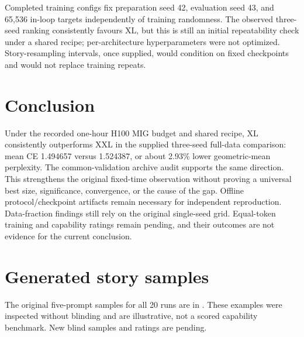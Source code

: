 \documentclass[12pt]{article}
\begin{document}
Completed training configs fix preparation seed 42, evaluation seed 43, and
65{,}536 in-loop targets independently of training randomness. The observed
three-seed ranking consistently favours XL, but this is still an initial
repeatability check under a shared recipe; per-architecture hyperparameters were
not optimized. Story-resampling intervals, once supplied, would condition on fixed
checkpoints and would not replace training repeats.

\section{Conclusion}
Under the recorded one-hour H100 MIG budget and shared recipe, XL consistently
outperforms XXL in the supplied three-seed full-data comparison: mean CE 1.494657
versus 1.524387, or about 2.93\% lower geometric-mean perplexity. The common-validation
archive audit supports the same direction. This strengthens the original
fixed-time observation without proving a universal best size, significance,
convergence, or the cause of the gap. Offline protocol/checkpoint artifacts remain
necessary for independent reproduction. Data-fraction findings still rely on the
original single-seed grid. Equal-token training and capability ratings remain
pending, and their outcomes are not evidence for the current conclusion.




\appendix
\section{Generated story samples}
The original five-prompt samples for all 20 runs are in
. These examples were inspected without
blinding and are illustrative, not a scored capability benchmark.
New blind samples and ratings are pending.
\end{document}
